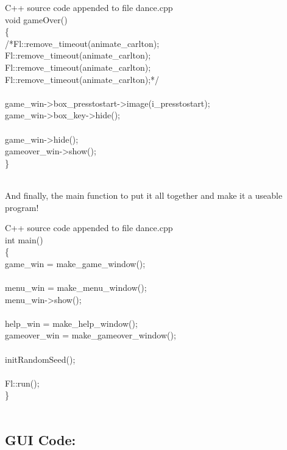 \documentclass {article}
\begin{document}
\begin{GFT}{C++ source code appended to file dance.cpp}
\+\\
\+void gameOver()\\
\+\{\\
\+	/*Fl::remove\_timeout(animate\_carlton);\\
\+	Fl::remove\_timeout(animate\_carlton);\\
\+	Fl::remove\_timeout(animate\_carlton);\\
\+	Fl::remove\_timeout(animate\_carlton);*/\\
\+\\
\+	game\_win->box\_presstostart->image(i\_presstostart);\\
\+	game\_win->box\_key->hide();\\
\+\\
\+	game\_win->hide();\\
\+	gameover\_win->show();\\
\+\}\\
\+\\
\end{GFT}
\clearpage
And finally, the main function to put it all together and make it a useable program!

\begin{GFT}{C++ source code appended to file dance.cpp}
\+\\
\+int main()\\
\+\{\\
\+	game\_win = make\_game\_window();\\
\+\\
\+	menu\_win = make\_menu\_window();\\
\+	menu\_win->show();\\
\+\\
\+	help\_win = make\_help\_window();\\
\+	gameover\_win = make\_gameover\_window();\\
\+\\
\+	initRandomSeed();\\
\+\\
\+	Fl::run();\\
\+\}\\
\+\\
\end{GFT}
\clearpage
\subsection*{GUI Code:}


\clearpage
\end{document}

